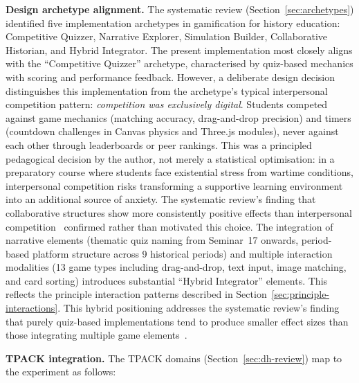 \textbf{Design archetype alignment.} The systematic review (Section~\ref{sec:archetypes}) identified five implementation archetypes in gamification for history education: Competitive Quizzer, Narrative Explorer, Simulation Builder, Collaborative Historian, and Hybrid Integrator. The present implementation most closely aligns with the ``Competitive Quizzer'' archetype, characterised by quiz-based mechanics with scoring and performance feedback. However, a deliberate design decision distinguishes this implementation from the archetype's typical interpersonal competition pattern: \textit{competition was exclusively digital}. Students competed against game mechanics (matching accuracy, drag-and-drop precision) and timers (countdown challenges in Canvas physics and Three.js modules), never against each other through leaderboards or peer rankings. This was a principled pedagogical decision by the author, not merely a statistical optimisation: in a preparatory course where students face existential stress from wartime conditions, interpersonal competition risks transforming a supportive learning environment into an additional source of anxiety. The systematic review's finding that collaborative structures show more consistently positive effects than interpersonal competition~\cite{Hamari2014, KorniienkoSemerikov2024} confirmed rather than motivated this choice. The integration of narrative elements (thematic quiz naming from Seminar~17 onwards, period-based platform structure across 9 historical periods) and multiple interaction modalities (13 game types including drag-and-drop, text input, image matching, and card sorting) introduces substantial ``Hybrid Integrator'' elements. This reflects the principle interaction patterns described in Section~\ref{sec:principle-interactions}. This hybrid positioning addresses the systematic review's finding that purely quiz-based implementations tend to produce smaller effect sizes than those integrating multiple game elements~\cite{KorniienkoSemerikov2024}.

\textbf{TPACK integration.} The TPACK domains (Section~\ref{sec:dh-review}) map to the experiment as follows:

